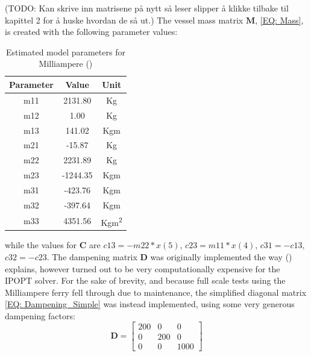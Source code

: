 (TODO: Kan skrive inn matrisene på nytt så leser slipper å klikke tilbake til kapittel 2 for å huske hvordan de så ut.)
The vessel mass matrix $\textbf{M}$, \eqref{EQ: Mass}, is created with the following parameter values:
\begin{table}[ht!]
    \begin{center}
        \caption{Estimated model parameters for Milliampere (\cite{pedersen2019optimization})}
        \label{TAB: Model parameter values}
        \begin{tabular}{c|c|c}
            \hline
            \textbf{Parameter} & \textbf{Value} & \textbf{Unit}\\
            \hline
            m11 & 2131.80 & Kg\\
            m12 & 1.00    & Kg \\
            m13 & 141.02  & Kgm\\
            m21 & -15.87  & Kg\\
            m22 & 2231.89 & Kg\\
            m23 & -1244.35 & Kgm\\
            m31 & -423.76 & Kgm\\
            m32 & -397.64 & Kgm\\
            m33 & 4351.56 & Kgm\textsuperscript{2}\\
        \end{tabular}
    \end{center}
\end{table}
while the values for $\textbf{C}$ are $c13 = -m22*x(5)$, $c23 = m11*x(4)$, $c31 = -c13$, $c32 = -c23$. The dampening matrix $\textbf{D}$ was originally
implemented the way (\cite{pedersen2019optimization}) explains, however turned out to be very computationally expensive for the \gls{IPOPT} solver.
For the sake of brevity, and because full scale tests using the Milliampere ferry fell through due to maintenance, the simplified diagonal matrix \eqref{EQ: Dampening_Simple}
was instead implemented, using some very generous dampening factors:
\begin{equation} \label{EQ: Dampening_method}
    \textbf{D} = \begin{bmatrix}
        200 & 0 & 0\\
        0 & 200 & 0\\
        0 & 0 & 1000
    \end{bmatrix}
\end{equation}

